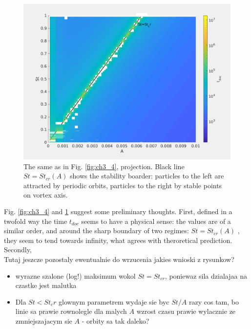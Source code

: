\documentclass[../main.tex]{subfiles}
\begin{document}
\begin{figure}
\centering
\noindent \includegraphics[width=30pc]{gfx/St_A_logt_exit_part_2D_eps000001_no_interp.png}
\caption{The same as in Fig. \ref{fig:ch3_4}, projection. Black line $St=St_{cr}(A)$ shows the stability boarder: particles to the left are attracted by periodic orbits, particles to the right by stable points on vortex axis.}
\label{fig:ch3_4x}
\end{figure}

Fig. \ref{fig:ch3_4} and \ref{fig:ch3_4x} suggest some preliminary thoughts. First, defined in a twofold way the time $t_{doc}$ seems to have a physical sense: the values are of a similar order, and around the sharp boundary of two regimes: $St=St_{cr}(A)$ , they seem to tend towards infinity, what agrees with theroretical prediction. Secondly,\\
Tutaj jeszcze pozostaly ewentualnie do wrzucenia jakies wnioski z rysunkow?
\begin{itemize}
\item wyrazne szalone (log!) maksimum wokol $St=St_{cr}$, poniewaz sila dzialajaa na czastke jest malutka
\item Dla $St<St_cr$ glownym parametrem wydaje sie byc $St/A$ razy cos tam, bo linie sa prawie rownolegle
dla malych $A$ wzrost czasu prawie wylacznie ze zmniejszajacym sie $A$ - orbity sa tak daleko?
\end{itemize}
\end{document}
